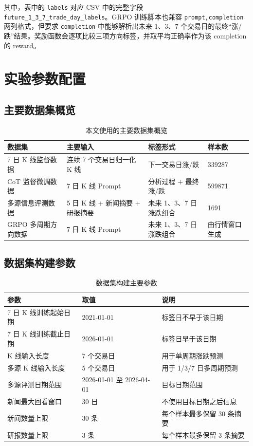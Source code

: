 其中，表中的 \texttt{labels} 对应 CSV 中的完整字段 \texttt{future\_1\_3\_7\_trade\_day\_labels}。GRPO 训练脚本也兼容 \texttt{prompt,completion} 两列格式，但要求 \texttt{completion} 中能够解析出未来 1、3、7 个交易日的最终“涨/跌”结果。奖励函数会逐项比较三项方向标签，并取平均正确率作为该 completion 的 reward。

\chapter{实验参数配置}

\section{主要数据集概览}

\begin{table}[htbp]
  \centering
  \caption{本文使用的主要数据集概览}
  \begin{tabular}{p{}p{}p{}p{}}
    \toprule
    数据集 & 主要输入 & 标签形式 & 样本数 \\
    \midrule
    7 日 K 线监督数据 & 连续 7 个交易日归一化 K 线 & 下一交易日涨/跌 & 339287 \\
    CoT 监督微调数据 & 7 日 K 线 Prompt & 分析过程 + 最终涨/跌 & 599871 \\
    多源信息评测数据 & 5 日 K 线 + 新闻摘要 + 研报摘要 & 未来 1、3、7 日涨跌组合 & 1691 \\
    GRPO 多周期方向数据 & 7 日 K 线 Prompt & 未来 1、3、7 日涨跌组合 & 由行情窗口生成 \\
    \bottomrule
  \end{tabular}
\end{table}

\section{数据集构建参数}

\begin{table}[htbp]
  \centering
  \caption{数据集构建主要参数}
  \begin{tabular}{@{}p{}p{}p{}@{}}
    \toprule
    参数 & 取值 & 说明 \\
    \midrule
    7 日 K 线训练起始日期 & 2021-01-01 & 标签日不早于该日期 \\
    7 日 K 线训练截止日期 & 2026-01-01 & 标签日早于该日期 \\
    K 线输入长度 & 7 个交易日 & 用于单周期涨跌预测 \\
    多源 K 线输入长度 & 5 个交易日 & 用于 1/3/7 日多周期预测 \\
    多源评测日期范围 & 2026-01-01 至 2026-04-01 & 目标日期范围 \\
    新闻最大回看窗口 & 30 日 & 不使用目标日期之后信息 \\
    新闻数量上限 & 30 条 & 每个样本最多保留 30 条摘要 \\
    研报数量上限 & 3 条 & 每个样本最多保留 3 条摘要 \\
    \bottomrule
  \end{tabular}
\end{table}

